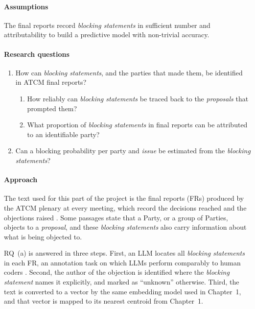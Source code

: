 \paragraph{Assumptions}
The final reports record \textit{blocking statements} in sufficient number and attributability
to build a predictive model with non-trivial accuracy. 


\paragraph{Research questions}
\begin{enumerate}[label=\alph*.]
  \item How can \textit{blocking statements}, and the parties that made them, be identified in
  ATCM final reports?
  \begin{enumerate}[label=\roman*.]
    \item How reliably can \textit{blocking statements} be traced back to the \textit{proposals}
    that prompted them?
    \item What proportion of \textit{blocking statements} in final reports can be attributed to
    an identifiable party?
  \end{enumerate}
  \item Can a blocking probability per party and \textit{issue} be estimated from the
  \textit{blocking statements}?
\end{enumerate}

\paragraph{Approach}
The text used for this part of the project is the final reports (FRs) produced by the ATCM plenary
at every meeting, which record the decisions reached and the objections raised
\parencite{ATCM46FinalReport,ATCM47FinalReport}. Some passages state that a Party, or a group of
Parties, objects to a \textit{proposal}, and these \textit{blocking statements} also carry
information about what is being objected to.

RQ~(a) is answered in three steps. First, an LLM locates all \textit{blocking statements} in each
FR, an annotation task on which LLMs perform comparably to human coders
\parencite{Gilardi2023}. Second, the author of the objection is identified where the \textit{blocking statement} names
it explicitly, and marked as ``unknown'' otherwise. Third, the text is converted to a vector by
the same embedding model used in Chapter~1, and that vector is mapped to its nearest centroid from
Chapter~1.

